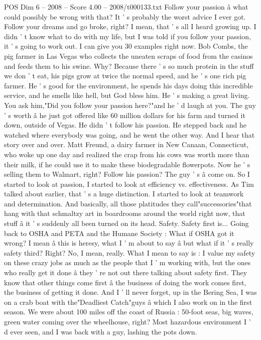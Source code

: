 \begin{textsample}{POS Dim 6 – 2008 – Score 4.00 – 2008/t000133.txt}
Follow your passion â what could possibly be wrong with that?
It ' s probably the worst advice I ever got.
Follow your dreams and go broke, right?
I mean, that ' s all I heard growing up.
I didn ' t know what to do with my life, but I was told if you follow your passion, it ' s going to work out.
I can give you 30 examples right now.
Bob Combs, the pig farmer in Las Vegas who collects the uneaten scraps of food from the casinos and feeds them to his swine.
Why?
Because there ' s so much protein in the stuff we don ' t eat, his pigs grow at twice the normal speed, and he ' s one rich pig farmer.
He ' s good for the environment, he spends his days doing this incredible service, and he smells like hell, but God bless him.
He ' s making a great living.
You ask him,"Did you follow your passion here?"and he ' d laugh at you.
The guy ' s worth â he just got offered like 60 million dollars for his farm and turned it down, outside of Vegas.
He didn ' t follow his passion.
He stepped back and he watched where everybody was going, and he went the other way.
And I hear that story over and over.
Matt Freund, a dairy farmer in New Canaan, Connecticut, who woke up one day and realized the crap from his cows was worth more than their milk, if he could use it to make these biodegradable flowerpots.
Now he ' s selling them to Walmart, right?
Follow his passion?
The guy ' s â come on.
So I started to look at passion, I started to look at efficiency vs. effectiveness.
As Tim talked about earlier, that ' s a huge distinction.
I started to look at teamwork and determination.
And basically, all those platitudes they call"successories"that hang with that schmaltzy art in boardrooms around the world right now, that stuff â it ' s suddenly all been turned on its head.
Safety.
Safety first is...
Going back to OSHA and PETA and the Humane Society : What if OSHA got it wrong?
I mean â this is heresy, what I ' m about to say â but what if it ' s really safety third?
Right?
No, I mean, really.
What I mean to say is : I value my safety on these crazy jobs as much as the people that I ' m working with, but the ones who really get it done â they ' re not out there talking about safety first.
They know that other things come first â the business of doing the work comes first, the business of getting it done.
And I ' ll never forget, up in the Bering Sea, I was on a crab boat with the"Deadliest Catch"guys â which I also work on in the first season.
We were about 100 miles off the coast of Russia : 50-foot seas, big waves, green water coming over the wheelhouse, right?
Most hazardous environment I ' d ever seen, and I was back with a guy, lashing the pots down.

\end{textsample}
